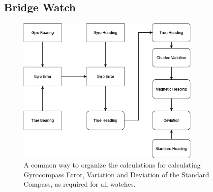 \documentclass[letterpaper,12pt]{article}
\begin{document}
\subsection{Bridge Watch}
\begin{figure}[htbp]
	\centering
	\includegraphics[width=0.8\textwidth]{static/getgettvmdc.drawio.png}
	\caption{A common way to organize the calculations for calculating Gyrocompass Error, Variation and Deviation of the Standard Compass, as required for all watches.}
	\label{fig:getget}
\end{figure}
\clearpage
\end{document}
